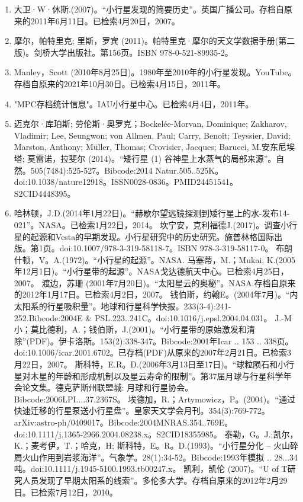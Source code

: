 \begin{enumerate}
\item 大卫·W·休斯.(2007)。“小行星发现的简要历史”。英国广播公司。存档自原来的2011年6月11日。已检索4月20日，2007。
\item 摩尔，帕特里克; 里斯，罗宾 (2011)。帕特里克·摩尔的天文学数据手册(第二版)。剑桥大学出版社。第156页。ISBN 978-0-521-89935-2。
\item Manley，Scott (2010年8月25日)。1980年至2010年的小行星发现。YouTube。存档自原来的2021年10月30日。已检索4月15日，2011年。
\item "MPC存档统计信息"。IAU小行星中心。已检索4月4日，2011年。
\item 迈克尔·库珀斯; 劳伦斯·奥罗克；Bockelée-Morvan, Dominique; Zakharov, Vladimir; Lee, Seungwon; von Allmen, Paul; Carry, Benoît; Teyssier, David; Marston, Anthony; Müller, Thomas; Crovisier, Jacques; Barucci, M.安东尼埃塔; 莫雷诺，拉斐尔 (2014)。“矮行星 (1) 谷神星上水蒸气的局部来源”。自然。505(7484):525-527。Bibcode:2014 Natur.505..525K。doi:10.1038/nature12918。ISSN0028-0836。PMID24451541。S2CID4448395。   
\item 哈林顿，J.D.(2014年1月22日)。“赫歇尔望远镜探测到矮行星上的水-发布14-021”。NASA。已检索1月22日，2014。
 坎宁安，克利福德J.(2017)。调查小行星的起源和Vesta的早期发现。小行星研究中的历史研究。施普林格国际出版。第1页。doi:10.1007/978-3-319-58118-7。ISBN 978-3-319-58117-0。
 布朗什顿，V。A.(1972)。“小行星的起源”。NASA.
 马塞蒂，M.；Mukai, K.(2005年12月1日)。“小行星带的起源”。NASA戈达德航天中心。已检索4月25日，2007。
 渡边，苏珊 (2001年7月20日)。“太阳星云的奥秘”。NASA.存档自原来的2012年1月17日。已检索4月2日，2007。
 钱伯斯，约翰E。(2004年7月)。“内太阳系的行星吸积量”。地球和行星科学快报。233(3-4):241-252.Bibcode:2004E & PSL.223..241C。doi:10.1016/j.epsl.2004.04.031。
 J.-M小；莫比德利，A.；钱伯斯，J.(2001)。“小行星带的原始激发和清除”(PDF)。伊卡洛斯。153(2):338-347。Bibcode:2001年Icar .. 153 .. 338页。doi:10.1006/icar.2001.6702。已存档(PDF)从原来的2007年2月21日。已检索3月22日，2007。
 斯科特，E.R。D.(2006年3月13日至17日)。“球粒陨石和小行星对木星的年龄和形成机制以及星云寿命的限制”。第37届月球与行星科学年会论文集。德克萨斯州联盟城: 月球和行星协会。Bibcode:2006LPI....37.2367S。
 埃德加，R.；Artymowicz，P。(2004)。“通过快速迁移的行星泵送小行星盘”。皇家天文学会月刊。354(3):769-772。arXiv:astro-ph/0409017。Bibcode:2004MNRAS.354..769E。doi:10.1111/j.1365-2966.2004.08238.x。S2CID18355985。 
 泰勒，G。J.;凯尔，K.；麦考伊，T.；哈克，H; 斯科特，E。R。D.(1993)。“小行星分化 -- 火山碎屑火山作用到岩浆海洋”。气象学。28(1):34-52。Bibcode:1993年模拟 .. 28...34吨。doi:10.1111/j.1945-5100.1993.tb00247.x。
 凯利，凯伦 (2007)。“U of T研究人员发现了早期太阳系的线索”。多伦多大学。存档自原来的2012年2月29日。已检索7月12日，2010。

\end{enumerate}
